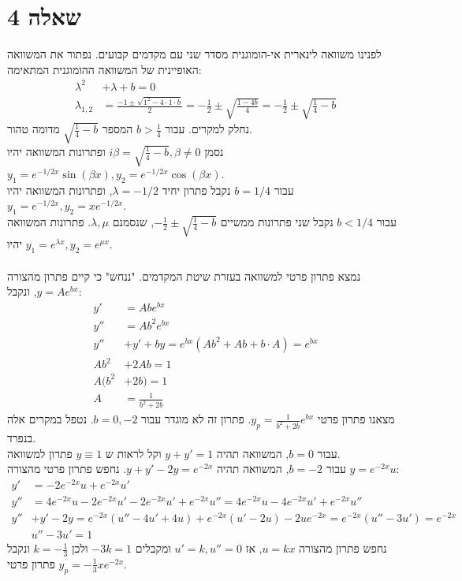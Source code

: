 \documentclass{article}
\begin{document}
\pagebreak

\section*{שאלה 4}
לפנינו משוואה לינארית אי-הומוגנית מסדר שני עם מקדמים קבועים. נפתור את המשוואה האופיינית של המשוואה ההומוגנית המתאימה:
\begin{align*}
    \lambda^2     & +\lambda+b  =0                                                                                                           \\
    \lambda_{1,2} & =\frac{-1\pm\sqrt{1^2-4\cdot 1 \cdot b}}{2}=-\frac{1}{2}\pm \sqrt{\frac{1-4b}{4}} = -\frac{1}{2}\pm \sqrt{\frac{1}{4}-b}
\end{align*}
נחלק למקרים. עבור $b>\frac{1}{4}$ המספר $\sqrt{\frac{1}{4}-b}$ מדומה טהור. \\
נסמן $i\beta=\sqrt{\frac{1}{4}-b}, \beta\ne 0$ ופתרונות המשוואה יהיו $y_1=e^{-1/2x}\sin (\beta x), y_2=e^{-1/2x}\cos(\beta x)$. \\
עבור $b=1/4$ נקבל פתרון יחיד $\lambda=-1/2$, ופתרונות המשוואה יהיו $y_1=e^{-1/2x}, y_2=xe^{-1/2x}$. \\
עבור $b<1/4$ נקבל שני פתרונות ממשיים $-\frac{1}{2}\pm \sqrt{\frac{1}{4}-b}$, שנסמנם $\lambda, \mu$. פתרונות המשוואה יהיו $y_1=e^{\lambda x}, y_2=e^{\mu x}$.\\\\
נמצא פתרון פרטי למשוואה בעזרת שיטת המקדמים. "ננחש" כי קיים פתרון מהצורה $y=Ae^{bx}$, ונקבל:
\begin{align*}
    y'    & =Abe^{bx}                                \\
    y''   & =Ab^2e^{bx}                              \\
    y''   & +y'+by=e^{bx}(Ab^2+Ab+b\cdot A) = e^{bx} \\
    Ab^2  & +2Ab=1                                   \\
    A(b^2 & +2b)=1                                   \\
    A     & =\frac{1}{b^2+2b}
\end{align*}
מצאנו פתרון פרטי $y_p=\frac{1}{b^2+2b}e^{bx}$.
פתרון זה לא מוגדר עבור $b=0,-2$. נטפל במקרים אלה בנפרד. \\
עבור $b=0$, המשוואה תהיה $y+y'=1$ וקל לראות ש $y\equiv1$ פתרון למשוואה. \\
עבור $b=-2$, המשוואה תהיה $y+y'-2y=e^{-2x}$. נחפש פתרון פרטי מהצורה $y=e^{-2x}u$:
\begin{align*}
    y'  & =-2e^{-2x}u+e^{-2x}u'                                                          \\
    y'' & = 4e^{-2x}u-2e^{-2x}u'-2e^{-2x}u'+e^{-2x}u''=4e^{-2x}u-4e^{-2x}u'+e^{-2x}u''   \\
    y'' & +y'-2y = e^{-2x}(u''-4u'+4u)+e^{-2x}(u'-2u)-2ue^{-2x}=e^{-2x}(u''-3u')=e^{-2x} \\
        & u''-3u'=1
\end{align*}
נחפש פתרון מהצורה $u=kx$, אז $u'=k,u''=0$ ומקבלים $-3k=1$ ולכן $k=-\frac{1}{3}$
ונקבל פתרון פרטי $y_p=-\frac{1}{3}xe^{-2x}$.
\end{document}
